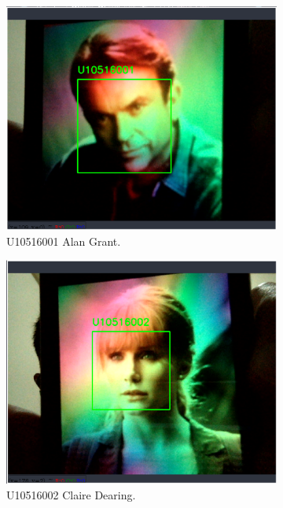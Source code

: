 \begin{figure}[h!]
  \centering
  \begin{subfigure}[b]{0.32\linewidth}
    \includegraphics[width=\linewidth]{figures/exp01.eps}
    \caption{U10516001 Alan Grant.}
  \end{subfigure}
  \begin{subfigure}[b]{0.32\linewidth}
    \includegraphics[width=\linewidth]{figures/exp02.eps}
    \caption{U10516002 Claire Dearing.}
  \end{subfigure}
  \begin{subfigure}[b]{0.32\linewidth}

\end{subfigure}
\end{figure}
